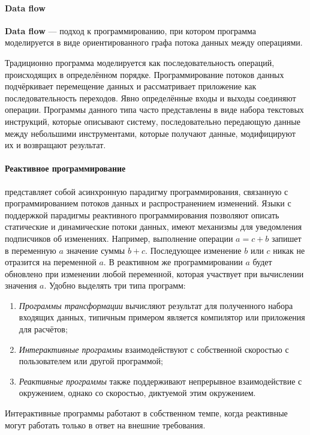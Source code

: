 \paragraph{Data flow}
\textbf{Data flow} --- подход к программированию, при котором программа моделируется в виде ориентированного графа потока данных между операциями. \cite{wiki:data-flow} 

Традиционно программа моделируется как последовательность операций, происходящих в определённом порядке. Программирование потоков данных подчёркивает перемещение данных и рассматривает приложение как последовательность переходов. Явно определённые входы и выходы соединяют операции. Программы данного типа часто представлены в виде набора текстовых инструкций, которые описывают систему, последовательно передающую данные между небольшими инструментами, которые получают данные, модифицируют их и возвращают результат. 

\paragraph{Реактивное программирование}
представляет собой асинхронную парадигму программирования, связанную с программированием потоков данных и распространением изменений. Языки с поддержкой парадигмы реактивного программирования позволяют описать статические и динамические потоки данных, имеют механизмы для уведомления подписчиков об изменениях. Например, выполнение операции \(a = c + b\) запишет в переменную \(a\) значение суммы \(b + c\). Последующее изменение \(b\) или \(c\) никак не отразится на переменной \(a\). В реактивном же программировании \(a\) будет обновлено при изменении любой переменной, которая участвует при вычислении значения \(a\).
Удобно выделять три типа программ:
\begin{enumerate}
	\item \textit{Программы трансформации} вычисляют результат для полученного набора входящих данных, типичным примером является компилятор или приложения для расчётов;
	\item \textit{Интерактивные программы} взаимодействуют с собственной скоростью с пользователем или другой программой;
	\item \textit{Реактивные программы} также поддерживают непрерывное взаимодействие с окружением, однако со скоростью, диктуемой этим окружением.
\end{enumerate}
Интерактивные программы работают в собственном темпе, когда реактивные могут работать только в ответ на внешние требования.
